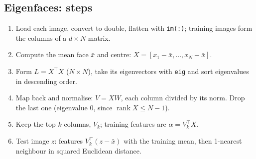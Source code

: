 \documentclass[11pt]{article}
\newcommand{\T}{^{\top}}
\begin{document}
\subsection*{Eigenfaces: steps}
\begin{enumerate}
\item Load each image, convert to double, flatten with \texttt{im(:)}; training images form the columns of a $d\times N$ matrix.
\item Compute the mean face $\bar x$ and centre: $X=[x_1-\bar x,\dots,x_N-\bar x]$.
\item Form $L=X\T X$ ($N\times N$), take its eigenvectors with \texttt{eig} and sort eigenvalues in descending order.
\item Map back and normalise: $V=XW$, each column divided by its norm. Drop the last one (eigenvalue 0, since $\operatorname{rank}X\le N-1$).
\item Keep the top $k$ columns, $V_k$; training features are $\alpha=V_k\T X$.
\item Test image $z$: features $V_k\T(z-\bar x)$ with the training mean, then 1-nearest neighbour in squared Euclidean distance.
\end{enumerate}
\end{document}
